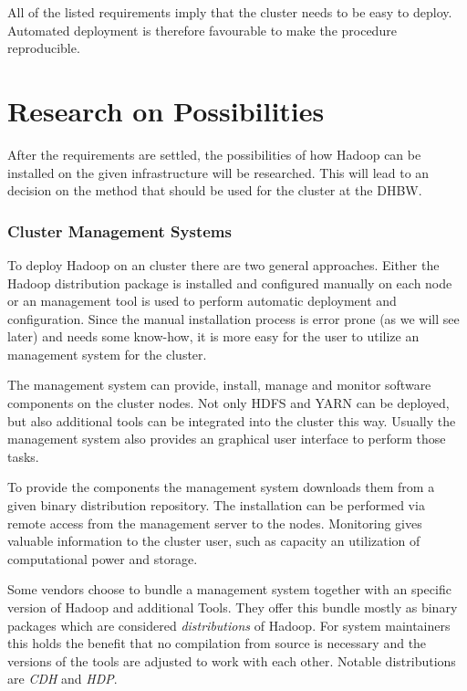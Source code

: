 All of the listed requirements imply that the cluster needs to be easy to deploy. 
Automated deployment is therefore favourable to make the procedure reproducible. 


\section{Research on Possibilities}

After the requirements are settled,
the possibilities of how Hadoop can be installed 
on the given infrastructure will be researched.
This will lead to an decision on the method that should be used for the cluster at the \ac{DHBW}.

\subsubsection{Cluster Management Systems}

To deploy Hadoop on an cluster there are two general approaches. Either the Hadoop distribution package is installed and configured manually on each node or an management tool is used to perform automatic deployment and configuration. 
Since the manual installation process is error prone (as we will see later) and needs some know-how,
it is  more easy for the user to utilize an management system for the cluster.

The management system can provide, install, manage and monitor software components on the cluster nodes.
Not only \ac{HDFS} and \ac{YARN} can be deployed,
but also additional tools can be integrated into the cluster this way.
Usually the management system also provides an graphical user interface to perform those tasks.

To provide the components the management system downloads them from a given binary distribution repository. The installation can be performed via remote access from the management server to the nodes. Monitoring gives valuable information to the cluster user, such as capacity an utilization of computational power and storage.

Some vendors choose to bundle a management system 
together with an specific version of Hadoop and additional Tools. They offer this bundle mostly as binary packages which are considered \emph{distributions} of Hadoop.
For system maintainers this holds the benefit that no compilation from source is necessary and the versions of the tools are adjusted to work with each other. 
Notable distributions are \emph{\acf{CDH}} and \emph{\acf{HDP}}. 

